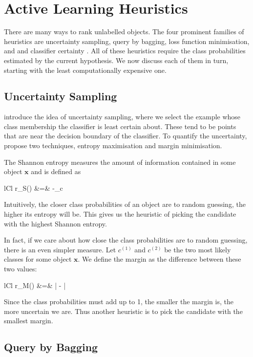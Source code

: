 \section{Active Learning Heuristics}
\label{sec:heuristics}

There are many ways to rank unlabelled objects. The four prominent families
of heuristics are uncertainty sampling, query by bagging, loss function minimisation, and
and classifier certainty \cite{schein07}. All of these heuristics require the
class probabilities estimated by the current hypothesis. 
We now discuss each of them in turn, starting with the least computationally expensive
one.

\subsection{Uncertainty Sampling}

 introduce the idea of uncertainty sampling, where we select the example
whose class membership the classifier is least certain about.
These tend to be points that are near the decision boundary of the classifier. To quantify
the uncertainty,  propose two techniques, entropy maximisation and
margin minimisation.

The Shannon entropy measures the amount of information contained in some object $\bm{x}$
and is defined as
	\begin{IEEEeqnarray*}{lCl}
		r_S() &=& -\sum_{c \in \Y}  \log \big[\Prob{y(\bm{x}) = c} \big]
	\end{IEEEeqnarray*}
Intuitively, the closer class probabilities of an object
are to random guessing, the higher its entropy will be. This gives us the heuristic
of picking the candidate with the highest Shannon entropy.

In fact, if we care about how close the class probabilities are to random guessing, 
there is an even simpler measure. 
Let $c^{(1)}$ and $c^{(2)}$ be the two most likely classes for some object $\bm{x}$.
We define the margin as the difference between these two values:
	\begin{IEEEeqnarray*}{lCl}
		r_M() &=& \Big|   -   \Big|
	\end{IEEEeqnarray*}
Since the class probabilities must add up to 1, the smaller the margin is,
the more uncertain we are. Thus another heuristic is
to pick the candidate with the smallest margin.


\subsection{Query by Bagging}

